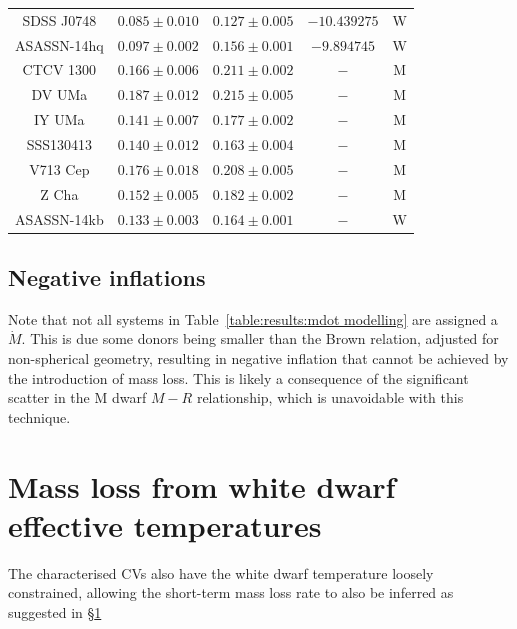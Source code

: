 \begin{table}
\begin{tabular}{ccccc}
        SDSS J0748          & $0.085\pm0.010$           & $0.127\pm0.005$           & $ -10.439275$                                     & W \\
        ASASSN-14hq         & $0.097\pm0.002$           & $0.156\pm0.001$           & $  -9.894745$                                     & W \\
        CTCV 1300           & $0.166\pm0.006$           & $0.211\pm0.002$           & $-$                                               & M \\
        DV UMa              & $0.187\pm0.012$           & $0.215\pm0.005$           & $-$                                               & M \\
        IY UMa              & $0.141\pm0.007$           & $0.177\pm0.002$           & $-$                                               & M \\
        SSS130413           & $0.140\pm0.012$           & $0.163\pm0.004$           & $-$                                               & M \\
        V713 Cep            & $0.176\pm0.018$           & $0.208\pm0.005$           & $-$                                               & M \\
        Z Cha               & $0.152\pm0.005$           & $0.182\pm0.002$           & $-$                                               & M \\
        ASASSN-14kb         & $0.133\pm0.003$           & $0.164\pm0.001$           & $-$                                               & W \\
        \hline
    \end{tabular}
\end{table}


\subsection{Negative inflations}

Note that not all systems in Table~\ref{table:results:mdot modelling} are assigned a $\dot M$. This is due some donors being smaller than the Brown relation, adjusted for non-spherical geometry, resulting in negative inflation that cannot be achieved by the introduction of mass loss.
This is likely a consequence of the significant scatter in the M dwarf $M - R$ relationship, which is unavoidable with this technique.

\section{Mass loss from white dwarf effective temperatures}

The characterised CVs also have the white dwarf temperature loosely constrained, allowing the short-term mass loss rate to also be inferred as suggested in \S\ref{}

